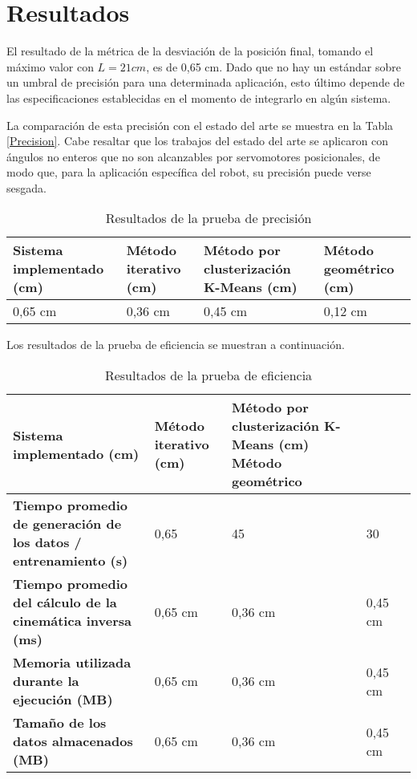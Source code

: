 \section{Resultados}

El resultado de la métrica de la desviación de la posición final, tomando el máximo valor con $L = 21 cm$, es de 0,65 cm. Dado que no hay un estándar sobre un umbral de precisión para una determinada aplicación, esto último depende de las especificaciones establecidas en el momento de integrarlo en algún sistema.

La comparación de esta precisión con el estado del arte se muestra en la Tabla \ref{Precision}. Cabe resaltar que los trabajos del estado del arte se aplicaron con ángulos no enteros que no son alcanzables por servomotores posicionales, de modo que, para la aplicación específica del robot, su precisión puede verse sesgada.

\begin{table}[ht]
	\centering
	\begin{tabular}{p{5cm}p{4cm}p{3.6cm}p{4cm}}
		\hline
		\textbf{Sistema implementado (cm)} & \textbf{Método iterativo (cm)} & \textbf{Método por clusterización K-Means (cm)} & \textbf{Método geométrico (cm)} \\
		\hline
		0,65 cm & 0,36 cm & 0,45 cm & 0,12 cm \\
		\hline
	\end{tabular}
	\caption{Resultados de la prueba de precisión}
	\label{tab:Precision}
\end{table}

Los resultados de la prueba de eficiencia se muestran a continuación.

\begin{table}[ht]
	\centering
	\begin{tabular}{p{4cm}p{5cm}p{4cm}p{3.6cm}p{4cm}}
		\hline
	    \textbf{Sistema implementado (cm)} & \textbf{Método iterativo (cm)} & \textbf{Método por clusterización K-Means (cm)} \textbf{Método geométrico} \\
		\hline
		\textbf{Tiempo promedio de generación de los datos / entrenamiento (s)} & 0,65 & 45 & 30 \\
		\textbf{Tiempo promedio del cálculo de la cinemática inversa (ms)} & 0,65 cm & 0,36 cm & 0,45 cm \\
		\textbf{Memoria utilizada durante la ejecución (MB)} & 0,65 cm & 0,36 cm & 0,45 cm \\
		\textbf{Tamaño de los datos almacenados (MB)} & 0,65 cm & 0,36 cm & 0,45 cm \\
		\hline
	\end{tabular}
	\caption{Resultados de la prueba de eficiencia}
	\label{tab:Precision}
\end{table}
